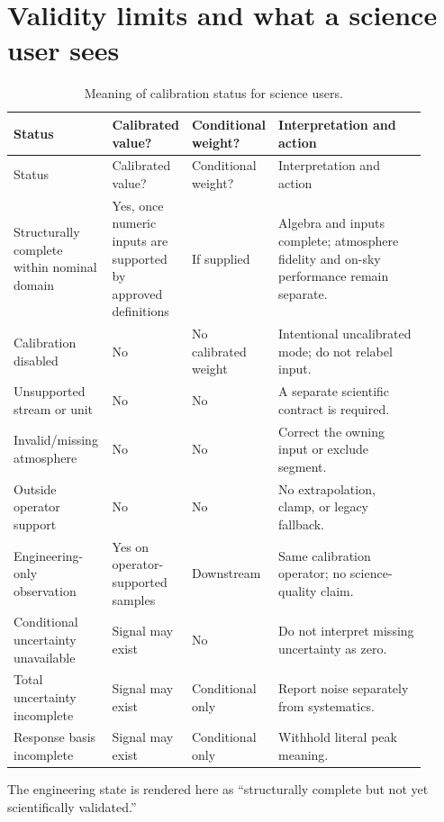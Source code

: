 \documentclass[11pt]{article}
\begin{document}
\section{Validity limits and what a science user sees}\label{sec:validity}
\begin{longtable}{L{0.24\linewidth}L{0.14\linewidth}L{0.14\linewidth}L{0.39\linewidth}}
\caption{Meaning of calibration status for science users.}\label{tab:user-states}\\
\toprule Status & Calibrated value? & Conditional weight? & Interpretation and action \\
\midrule\endfirsthead
\toprule Status & Calibrated value? & Conditional weight? & Interpretation and action \\
\midrule\endhead
Structurally complete within nominal domain & Yes, once numeric inputs are supported by approved definitions & If supplied & Algebra and inputs complete; atmosphere fidelity and on-sky performance remain separate. \\
Calibration disabled & No & No calibrated weight & Intentional uncalibrated mode; do not relabel input. \\
Unsupported stream or unit & No & No & A separate scientific contract is required. \\
Invalid/missing atmosphere & No & No & Correct the owning input or exclude segment. \\
Outside operator support & No & No & No extrapolation, clamp, or legacy fallback. \\
Engineering-only observation & Yes on operator-supported samples & Downstream & Same calibration operator; no science-quality claim. \\
Conditional uncertainty unavailable & Signal may exist & No & Do not interpret missing uncertainty as zero. \\
Total uncertainty incomplete & Signal may exist & Conditional only & Report noise separately from systematics. \\
Response basis incomplete & Signal may exist & Conditional only & Withhold literal peak meaning. \\
\bottomrule\end{longtable}
The engineering state  is rendered here
as ``structurally complete but not yet scientifically validated.''
\end{document}
